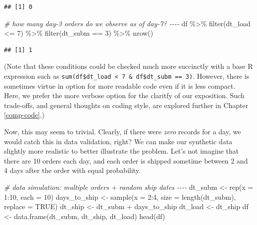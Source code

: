 \documentclass[
]{krantz}
\makeatletter
\newenvironment{Shaded}{\begin{snugshade}}{\end{snugshade}}
\newcommand{\AttributeTok}[1]{\textcolor[rgb]{0.61,0.61,0.61}{#1}}
\newcommand{\CommentTok}[1]{\textcolor[rgb]{0.37,0.37,0.37}{\textit{#1}}}
\newcommand{\ConstantTok}[1]{\textcolor[rgb]{0,0,0}{#1}}
\newcommand{\DecValTok}[1]{\textcolor[rgb]{0.06,0.06,0.06}{#1}}
\newcommand{\FunctionTok}[1]{\textcolor[rgb]{0,0,0}{#1}}
\newcommand{\NormalTok}[1]{#1}
\newcommand{\OtherTok}[1]{\textcolor[rgb]{0.37,0.37,0.37}{#1}}
\newcommand{\SpecialCharTok}[1]{\textcolor[rgb]{0,0,0}{#1}}
\newenvironment{kframe}{%
\medskip{}
\setlength{\fboxsep}{.8em}
 \def\at@end@of@kframe{}%
 \ifinner\ifhmode%
  \def\at@end@of@kframe{\end{minipage}}%
  \begin{minipage}{\columnwidth}%
 \fi\fi%
 \def\FrameCommand##1{\hskip\@totalleftmargin \hskip-\fboxsep
 \colorbox{shadecolor}{##1}\hskip-\fboxsep
     \hskip-\linewidth \hskip-\@totalleftmargin \hskip\columnwidth}%
 \MakeFramed {\advance\hsize-\width
   \@totalleftmargin\z@ \linewidth\hsize
   \@setminipage}}%
 {\par\unskip\endMakeFramed%
 \at@end@of@kframe}
\renewenvironment{Shaded}{\begin{kframe}}{\end{kframe}}
\makeatother
\begin{document}
\begin{verbatim}
## [1] 0
\end{verbatim}

\begin{Shaded}
\begin{Highlighting}[]
\CommentTok{\# how many day{-}3 orders do we observe as of day{-}7? {-}{-}{-}{-}}
\NormalTok{df }\SpecialCharTok{\%\textgreater{}\%} 
  \FunctionTok{filter}\NormalTok{(dt\_load }\SpecialCharTok{\textless{}=} \DecValTok{7}\NormalTok{) }\SpecialCharTok{\%\textgreater{}\%} 
  \FunctionTok{filter}\NormalTok{(dt\_subm }\SpecialCharTok{==} \DecValTok{3}\NormalTok{) }\SpecialCharTok{\%\textgreater{}\%} 
  \FunctionTok{nrow}\NormalTok{()}
\end{Highlighting}
\end{Shaded}

\begin{verbatim}
## [1] 1
\end{verbatim}

(Note that these conditions could be checked much more succinctly with a base R expression such as \texttt{sum(df\$dt\_load\ \textless{}\ 7\ \&\ df\$dt\_subm\ ==\ 3)}.
However, there is sometimes virtue in option for more readable code even if it is less compact.
Here, we prefer the more verbose option for the claritfy of our exposition.
Such trade-offs, and general thoughts on coding style, are explored further in Chapter \ref{comp-code}.)

Now, this may seem to trivial. Clearly, if there were \emph{zero} records for a day, we would catch this in data validation, right?
We can make our synthetic data slightly more realistic to better illustrate the problem.
Let's not imagine that there are 10 orders each day, and each order is shipped sometime between 2 and 4 days after the order with equal probability.

\begin{Shaded}
\begin{Highlighting}[]
\CommentTok{\# data simulation: multiple orders + random ship dates {-}{-}{-}{-}}
\NormalTok{dt\_subm }\OtherTok{\textless{}{-}} \FunctionTok{rep}\NormalTok{(}\AttributeTok{x =} \DecValTok{1}\SpecialCharTok{:}\DecValTok{10}\NormalTok{, }\AttributeTok{each =} \DecValTok{10}\NormalTok{)}
\NormalTok{days\_to\_ship }\OtherTok{\textless{}{-}} \FunctionTok{sample}\NormalTok{(}\AttributeTok{x =} \DecValTok{2}\SpecialCharTok{:}\DecValTok{4}\NormalTok{, }\AttributeTok{size =} \FunctionTok{length}\NormalTok{(dt\_subm), }\AttributeTok{replace =} \ConstantTok{TRUE}\NormalTok{)}
\NormalTok{dt\_ship }\OtherTok{\textless{}{-}}\NormalTok{ dt\_subm }\SpecialCharTok{+}\NormalTok{ days\_to\_ship}
\NormalTok{dt\_load }\OtherTok{\textless{}{-}}\NormalTok{ dt\_ship}
\NormalTok{df }\OtherTok{\textless{}{-}} \FunctionTok{data.frame}\NormalTok{(dt\_subm, dt\_ship, dt\_load)}
\FunctionTok{head}\NormalTok{(df)}
\end{Highlighting}
\end{Shaded}
\end{document}

